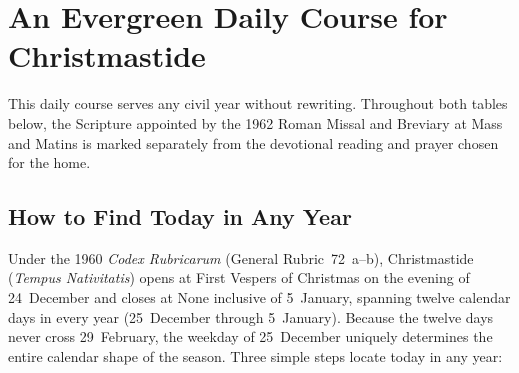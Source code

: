 \section{An Evergreen Daily Course for Christmastide}\label{app:daily-course}

This daily course serves any civil year without rewriting. Throughout both
tables below, the Scripture appointed by the 1962 Roman Missal and Breviary at
Mass and Matins is marked separately from the devotional reading and prayer
chosen for the home.

\subsection{How to Find Today in Any Year}

Under the 1960 \textit{Codex Rubricarum} (General Rubric~72~a--b), Christmastide
(\textit{Tempus Nativitatis}) opens at First Vespers of Christmas on the evening
of 24~December and closes at None inclusive of 5~January, spanning twelve
calendar days in every year (25~December through 5~January). Because the twelve
days never cross 29~February, the weekday of 25~December uniquely determines the
entire calendar shape of the season. Three simple steps locate today in any
year:

